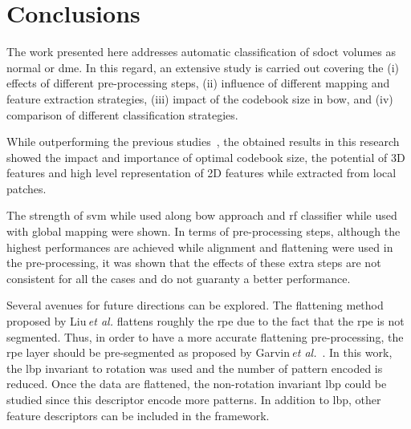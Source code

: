 \documentclass[review]{elsarticle}
\begin{document}
\maketitle

\linenumbers
\acresetall  %




%

\section{Conclusions}\label{sec:con}
The work presented here addresses automatic classification of \ac{sdoct} volumes as normal or \ac{dme}.
In this regard, an extensive study is carried out covering the
(i) effects of different pre-processing steps, 
(ii) influence of different mapping and feature extraction strategies,
(iii) impact of the codebook size in \ac{bow}, and
(iv) comparison of different classification strategies.

While outperforming the previous studies~\cite{Lemaintre2015miccaiOCT,Venhuizen2015}, the obtained results in this research showed the impact and importance of optimal codebook size, the potential of 3D features and high level representation of 2D features while extracted from local patches.

The strength of \ac{svm} while used along \ac{bow} approach and \ac{rf} classifier while used with global mapping were shown.
In terms of pre-processing steps, although the highest performances are achieved while alignment and flattening were used in the pre-processing, it was shown that the effects of these extra steps are not consistent for all the cases and do not guaranty a better performance.

Several avenues for future directions can be explored. The flattening method proposed by Liu\,\emph{et al.} flattens roughly the \ac{rpe} due to the fact that the \ac{rpe} is not segmented. Thus, in order to have a more accurate flattening pre-processing, the \ac{rpe} layer should be pre-segmented as proposed by Garvin\,\emph{et al.}~\cite{Garvin2009}. In this work, the \ac{lbp} invariant to rotation was used and the number of pattern encoded is reduced. Once the data are flattened, the non-rotation invariant \ac{lbp} could be studied since this descriptor encode more patterns. In addition to \ac{lbp}, other feature descriptors can be included in the framework.
\end{document}
